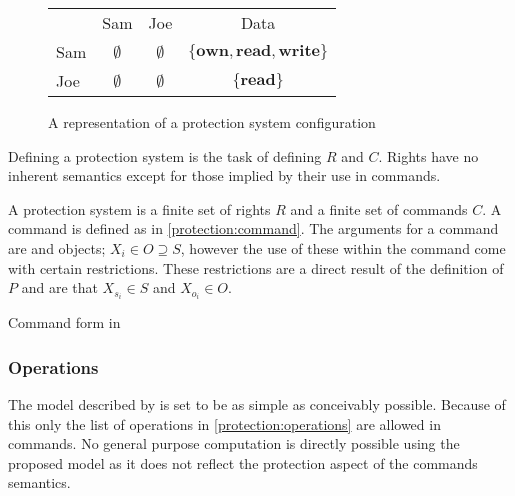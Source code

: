 \begin{figure}[h]
\centering
\begin{tabular}{l|c|c|c|}
\multicolumn{1}{c}{} & \multicolumn{1}{c}{Sam} & \multicolumn{1}{c}{Joe} & \multicolumn{1}{c}{Data} \\\cline{2-4}
Sam & $\emptyset$ & $\emptyset$ & $\{\textbf{own}, \textbf{read}, \textbf{write}\}$ \\\cline{2-4}
Joe & $\emptyset$ & $\emptyset$ & $\{\textbf{read}\}$ \\\cline{2-4}
\end{tabular}
\caption{A representation of a protection system configuration}
\label{protection:matrixsmall}
\end{figure}

Defining a protection system is the task of defining $R$ and $C$.
Rights have no inherent semantics except for those implied by their use in commands.

\begin{definition}
A protection system is a finite set of rights $R$ and a finite set of commands $C$.
A command is defined as in \cref{protection:command}. 
The arguments for a command are \subjects{} and objects; $X_i \in O \supseteq S$, however the use of these within the command come with certain restrictions.
These restrictions are a direct result of the definition of $P$ and are that $X_{s_i} \in S$ and $X_{o_i} \in O$.
\end{definition}

\begin{algorithm}
  \DontPrintSemicolon
  \cmd {} 
  \caption{Command form in \cite{HRU}\label{protection:command}}
\end{algorithm}

\subsubsection{Operations}
The model described by \citet{HRU} is set to be as simple as conceivably possible.
Because of this only the list of operations in \cref{protection:operations} are allowed in commands.
No general purpose computation is directly possible using the proposed model as it does not reflect the protection aspect of the commands semantics.


